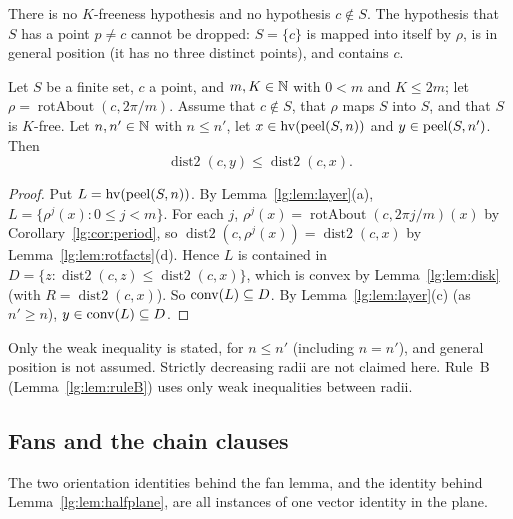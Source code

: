 \begin{remark}
There is no $K$-freeness hypothesis and no hypothesis $c\notin S$. The hypothesis that $S$ has a point $p\neq c$ cannot be
dropped: $S=\{c\}$ is mapped into itself by $\rho$, is in general position (it has no three distinct points), and
contains $c$.
\end{remark}

\begin{theorem}\label{lg:thm:radius}
Let $S$ be a finite set, $c$ a point, and $m,K\in\mathbb N$ with $0<m$ and $K\le 2m$; let $\rho=\operatorname{rotAbout}(c,2\pi/m)$.
Assume that $c\notin S$, that $\rho$ maps $S$ into $S$, and that $S$ is $K$-free. Let $n,n'\in\mathbb N$ with $n\le n'$, let
$x\in\operatorname{hv}(\operatorname{peel}(S,n))$ and $y\in\operatorname{peel}(S,n')$. Then
\[
  \operatorname{dist2}(c,y)\le\operatorname{dist2}(c,x).
\]
\end{theorem}

\begin{proof}
Put $L=\operatorname{hv}(\operatorname{peel}(S,n))$. By Lemma~\ref{lg:lem:layer}(a), $L=\{\rho^{j}(x):0\le j<m\}$. For each $j$,
$\rho^{j}(x)=\operatorname{rotAbout}(c,2\pi j/m)(x)$ by Corollary~\ref{lg:cor:period}, so
$\operatorname{dist2}(c,\rho^{j}(x))=\operatorname{dist2}(c,x)$ by Lemma~\ref{lg:lem:rotfacts}(d). Hence $L$ is
contained in $D=\{z:\operatorname{dist2}(c,z)\le\operatorname{dist2}(c,x)\}$, which is convex by Lemma~\ref{lg:lem:disk}
(with $R=\operatorname{dist2}(c,x)$). So $\operatorname{conv}(L)\subseteq D$. By Lemma~\ref{lg:lem:layer}(c) (as $n'\ge n$),
$y\in\operatorname{conv}(L)\subseteq D$.
\end{proof}

\begin{remark}
Only the weak inequality is stated, for $n\le n'$ (including $n=n'$), and general position is not assumed. Strictly
decreasing radii are not claimed here. Rule~B (Lemma~\ref{lg:lem:ruleB}) uses only weak inequalities between radii.
\end{remark}

\subsection{Fans and the chain clauses}\label{lg:ssec:chain}

The two orientation identities behind the fan lemma, and the identity behind Lemma~\ref{lg:lem:halfplane}, are all
instances of one vector identity in the plane.

